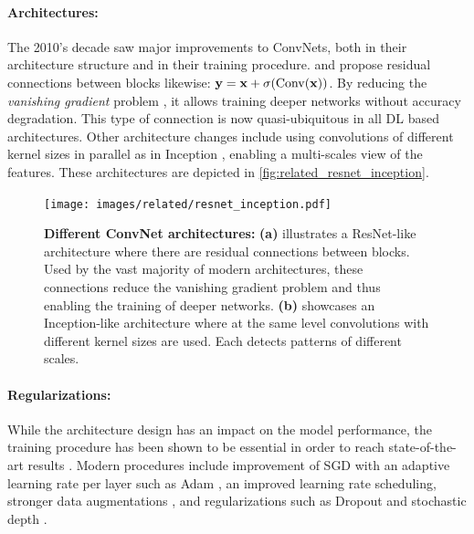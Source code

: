 \paragraph{Architectures:}The 2010's decade saw major improvements to \acp{ConvNet}, both in their
architecture structure and in their training procedure. \cite{srivastava2015highwaynet} and
\cite{he2016resnet} propose residual connections between blocks likewise: $\mathbf{y} = \mathbf{x} +
      \sigma(\operatorname{Conv}(\mathbf{x}))$. By reducing the \textit{vanishing gradient} problem
\citep{hochreiter2001vanishinggrad}, it allows training deeper networks without accuracy
degradation. This type of connection is now quasi-ubiquitous in all \ac{DL} based architectures.
Other architecture changes include using convolutions of different kernel sizes in parallel as in
Inception \citep{szegedy2015inception}, enabling a multi-scales view of the features. These
architectures are depicted in \autoref{fig:related_resnet_inception}.

\begin{figure}[tb]
      \begin{center}
            \texttt{[image: images/related/resnet\_inception.pdf]}
      \end{center}
      \caption{\textbf{Different ConvNet architectures:} \textbf{(a)} illustrates a ResNet-like
            architecture where there are residual connections between blocks. Used by the vast
            majority of modern architectures, these connections reduce the vanishing gradient problem
            and thus enabling the training of deeper networks. \textbf{(b)} showcases an Inception-like
            architecture where at the same level convolutions with different kernel sizes are used.
            Each detects patterns of different scales.}
      \label{fig:related_resnet_inception}
\end{figure}

\paragraph{Regularizations:} While the architecture design has an impact on the model performance,
the training procedure has been shown to be essential in order to reach state-of-the-art results
\citep{wightman2019resnetstrikesback}. Modern procedures include improvement of \ac{SGD} with an
adaptive learning rate per layer such as Adam \citep{kingma2014adam}, an improved learning rate
scheduling, stronger data augmentations
\citep{muller2021trivialaugment,hingyi2018mixup,zhong2017erasing}, and regularizations such as
Dropout \citep{gal2016dropout} and stochastic depth \citep{gao2016stochasticdepth}.

